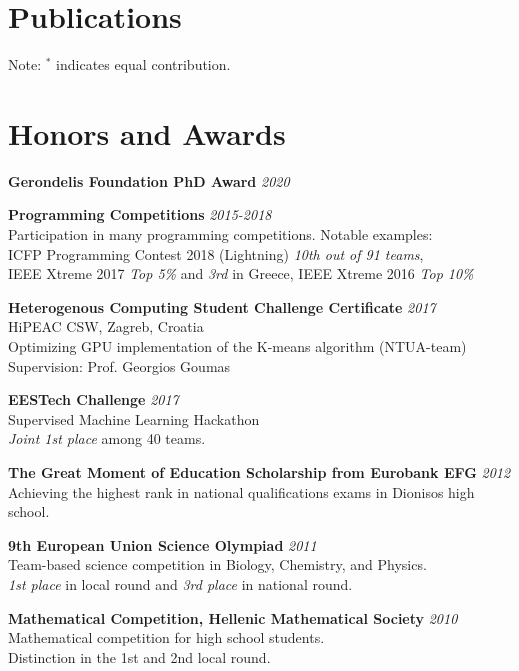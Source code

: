 \documentclass[margin]{res}
\begin{document}
\begin{resume}
\section{Publications}



Note: $^*$ indicates equal contribution.

\section{Honors and Awards}

\textbf{Gerondelis Foundation PhD Award} \hfill {\em 2020}

\textbf{Programming Competitions}  \hfill {\em 2015-2018} \\
Participation in many programming competitions. Notable examples: \\
ICFP Programming Contest 2018 (Lightning) \textit{10th out of 91 teams}, \\
IEEE Xtreme 2017 \textit{Top 5\%} and \textit{3rd} in Greece, IEEE Xtreme 2016 \textit{Top 10\%}

\textbf{Heterogenous Computing Student Challenge Certificate}  \hfill {\em 2017} \\
HiPEAC CSW, Zagreb, Croatia \\
Optimizing GPU implementation of the K-means algorithm (NTUA-team) \\
Supervision: Prof. Georgios Goumas

\textbf{EESTech Challenge}  \hfill {\em 2017} \\ 
Supervised Machine Learning Hackathon \\
\textit{Joint 1st place} among 40 teams.

\textbf{The Great Moment of Education Scholarship from Eurobank EFG}  \hfill {\em 2012} \\ 
Achieving the highest rank in national qualifications exams in Dionisos high school.

\textbf{9th European Union Science Olympiad} \hfill {\em 2011} \\ 
Team-based science competition in Biology, Chemistry, and Physics.\\
\textit{1st place} in local round and \textit{3rd place} in  national round. 

\textbf{Mathematical Competition, Hellenic Mathematical Society} \hfill {\em 2010} \\ 
Mathematical competition for high school students. \\
Distinction in the 1st and 2nd local round. 



\end{resume}
\end{document}
